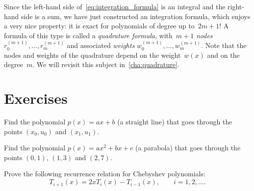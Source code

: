 Since the left-hand side of~\eqref{eq:integration_formula} is an integral and the right-hand side is a sum,
we have just constructed an integration formula,
which enjoys a very nice property: it is exact for polynomials of degree up to~$2m + 1$!
A formula of this type is called a \emph{quadrature formula},
with~$m+1$ \emph{nodes}~$r^{(m+1)}_0, \dotsc, r^{(m+1)}_m$ and associated \emph{weights} $w^{(m+1)}_0, \dotsc, w^{(m+1)}_m$.
Note that the nodes and weights of the quadrature depend on the weight~$w(x)$ and on the degree~$m$.
We will revisit this subject in~\cref{cha:quadrature}.

\section{Exercises}
\begin{exercise}
    Find the polynomial $p(x) = ax + b$ (a straight line) that goes through the points $(x_0, u_0)$ and $(x_1, u_1)$.
\end{exercise}

\begin{exercise}
    Find the polynomial $p(x) = ax^2 + b x + c$ (a parabola) that goes through the points $(0, 1)$, $(1, 3)$ and $(2, 7)$.
\end{exercise}

\begin{exercise}
    Prove the following recurrence relation for Chebyshev polynomials:
    \[
        T_{i+1}(x) = 2 x T_i(x) - T_{i-1}(x), \qquad i = 1, 2, \dotsc.
    \]
\end{exercise}

